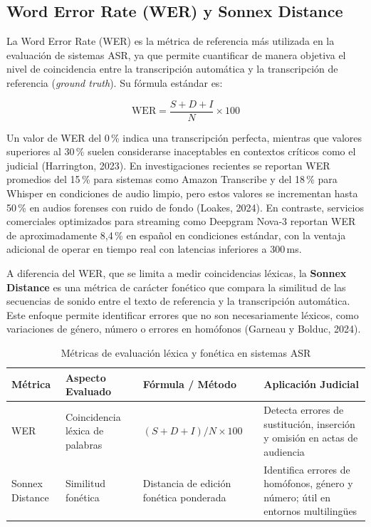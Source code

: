 \documentclass[12pt,a4paper,oneside]{report}
\begin{document}
\subsection{Word Error Rate (WER) y Sonnex Distance}

La Word Error Rate (WER) es la métrica de referencia más utilizada en la evaluación de sistemas ASR, ya que permite cuantificar de manera objetiva el nivel de coincidencia entre la transcripción automática y la transcripción de referencia (\textit{ground truth}). Su fórmula estándar es:

\begin{equation}
\text{WER} = \frac{S + D + I}{N} \times 100
\end{equation}

Un valor de WER del 0\,\% indica una transcripción perfecta, mientras que valores superiores al 30\,\% suelen considerarse inaceptables en contextos críticos como el judicial (Harrington, 2023). En investigaciones recientes se reportan WER promedios del 15\,\% para sistemas como Amazon Transcribe y del 18\,\% para Whisper en condiciones de audio limpio, pero estos valores se incrementan hasta 50\,\% en audios forenses con ruido de fondo (Loakes, 2024). En contraste, servicios comerciales optimizados para streaming como Deepgram Nova-3 reportan WER de aproximadamente 8,4\,\% en español en condiciones estándar, con la ventaja adicional de operar en tiempo real con latencias inferiores a 300\,ms.

A diferencia del WER, que se limita a medir coincidencias léxicas, la \textbf{Sonnex Distance} es una métrica de carácter fonético que compara la similitud de las secuencias de sonido entre el texto de referencia y la transcripción automática. Este enfoque permite identificar errores que no son necesariamente léxicos, como variaciones de género, número o errores en homófonos (Garneau y Bolduc, 2024).

\begin{table}[H]
\centering
\caption{Métricas de evaluación léxica y fonética en sistemas ASR}
\begin{tabular}{|p{3cm}|p{3cm}|p{4cm}|p{3cm}|}
\hline
\rowcolor{gray!20}
\textbf{Métrica} & \textbf{Aspecto Evaluado} & \textbf{Fórmula / Método} & \textbf{Aplicación Judicial} \\
\hline
WER & Coincidencia léxica de palabras & $(S+D+I)/N \times 100$ & Detecta errores de sustitución, inserción y omisión en actas de audiencia \\
\hline
Sonnex Distance & Similitud fonética & Distancia de edición fonética ponderada & Identifica errores de homófonos, género y número; útil en entornos multilingües \\
\hline
\end{tabular}
\label{tab:wer_sonnex}
\end{table}
\end{document}
